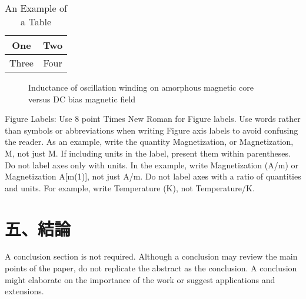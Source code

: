 \documentclass[letterpaper, 10pt, conference]{ieeeconf}   %
\begin{document}
\begin{CJK*}{UTF8}{bsmi}
\begin{table}[h]
\caption{An Example of a Table}
\label{table_example}
\begin{center}
\begin{tabular}{|c||c|}
\hline
One & Two\\
\hline
Three & Four\\
\hline
\end{tabular}
\end{center}
\end{table}


   \begin{figure}[thpb]
      \centering
      \caption{Inductance of oscillation winding on amorphous
       magnetic core versus DC bias magnetic field}
      \label{figurelabel}
   \end{figure}
   

Figure Labels: Use 8 point Times New Roman for Figure labels. Use words rather than symbols or abbreviations when writing Figure axis labels to avoid confusing the reader. As an example, write the quantity Magnetization, or Magnetization, M, not just M. If including units in the label, present them within parentheses. Do not label axes only with units. In the example, write Magnetization (A/m) or Magnetization {A[m(1)]}, not just A/m. Do not label axes with a ratio of quantities and units. For example, write Temperature (K), not Temperature/K.

\section*{五、結論}

A conclusion section is not required. Although a conclusion may review the main points of the paper, do not replicate the abstract as the conclusion. A conclusion might elaborate on the importance of the work or suggest applications and extensions. 

\addtolength{\textheight}{-12cm}  %


\end{CJK*}
\end{document}
